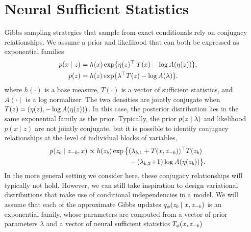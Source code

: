 \documentclass{article}
\theoremstyle{definition}
\begin{document}
\section{Neural Sufficient Statistics}
Gibbs sampling strategies that sample from exact conditionals rely on conjugacy relationships. We assume a prior and likelihood that can both be expressed as exponential families
\begin{align*}
    p(x \mid z) 
    &= 
    h(x) \exp \{ 
        \eta(z)^\top \: T(x)  
        -\log A(\eta(z)) \}, 
    \\
    p(z ) 
    &= 
    h(z) \exp \{ 
        \lambda^\top T(z) 
        - \log A(\lambda) \}.
\end{align*}
where $h(\cdot)$ is a base measure, $T(\cdot)$ is a vector of sufficient statistics, and $A(\cdot)$ is a log normalizer. The two densities are jointly conjugate when $T(z) = (\eta(z), -\log A(\eta(z)))$.
In this case, the posterior distribution lies in the same exponential family as the prior.
Typically, the prior $p(z \mid \lambda)$ and likelihood $p(x \mid z)$ are not jointly conjugate, but it is possible to identify conjugacy relationships at the level of individual blocks of variables, 
\begin{align*}
    p(z_b \mid z_{-b}, x)
    \propto
    h(z_b) 
    \exp \big\{ 
        &
        (\lambda_{b,1} + T(x, z_{-b}))^\top T(z_b) 
        \\
        &
        -
        (\lambda_{b,2} \!+\! 1) 
        \log A(\eta(z_b))
    \big\}
    .
\end{align*}
In the more general setting we consider here, these conjugacy relationships will typically not hold. However, we can still take inspiration to design variational distributions that make use of conditional independencies in a model. We will assume that each of the approximate Gibbs updates $q_\phi(z_b \mid x, z_{-b})$ is an exponential family, whose parameters are computed from a vector of prior parameters $\lambda$ and a vector of neural sufficient statistics $T_\phi(x, z_{-b})$
\end{document}
